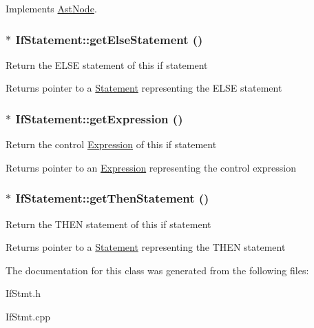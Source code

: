 Implements \hyperlink{classAstNode_a67b2d6ce1262da2954fb4db255759fb3}{AstNode}.\hypertarget{classIfStatement_a79a1c2c1a1d824c0160cdef2b9f87478}{
\subsubsection[{getElseStatement}]{$\ast$ IfStatement::getElseStatement ()}}
\label{classIfStatement_a79a1c2c1a1d824c0160cdef2b9f87478}
Return the ELSE statement of this if statement

\begin{DoxyReturn}{Returns}
pointer to a \hyperlink{classStatement}{Statement} representing the ELSE statement 
\end{DoxyReturn}
\hypertarget{classIfStatement_aa9a02bb22bf3f74c87fb979aa889d6b6}{
\subsubsection[{getExpression}]{$\ast$ IfStatement::getExpression ()}}
\label{classIfStatement_aa9a02bb22bf3f74c87fb979aa889d6b6}
Return the control \hyperlink{classExpression}{Expression} of this if statement

\begin{DoxyReturn}{Returns}
pointer to an \hyperlink{classExpression}{Expression} representing the control expression 
\end{DoxyReturn}
\hypertarget{classIfStatement_a77b917ab2b788e992f60ab5a1e56678b}{
\subsubsection[{getThenStatement}]{$\ast$ IfStatement::getThenStatement ()}}
\label{classIfStatement_a77b917ab2b788e992f60ab5a1e56678b}
Return the THEN statement of this if statement

\begin{DoxyReturn}{Returns}
pointer to a \hyperlink{classStatement}{Statement} representing the THEN statement 
\end{DoxyReturn}


The documentation for this class was generated from the following files:\begin{DoxyCompactItemize}
\item 
IfStmt.h\item 
IfStmt.cpp\end{DoxyCompactItemize}
